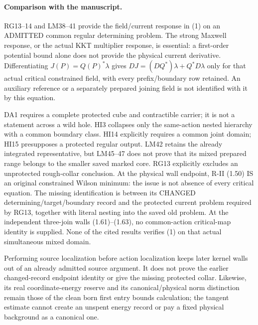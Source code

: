 \documentclass[11pt]{article}
\begin{document}
\paragraph{Comparison with the manuscript.}
RG13--14 and LM38--41 provide the field/current response in (1) on an ADMITTED
common regular determining problem. The strong Maxwell response, or the actual
KKT multiplier response, is essential: a first-order potential bound alone does
not provide the physical current derivative. Differentiating
$J(P)=Q(P)^*\lambda$ gives
$DJ=(DQ^*)\lambda+Q^*D\lambda$ only for that actual critical constrained field,
with every prefix/boundary row retained. An auxiliary reference or a separately
prepared joining field is not identified with it by this equation.

DA1 requires a complete protected cube and contractible carrier; it is not a
statement across a wild hole. HI3 collapses only the same-action nested hierarchy
with a common boundary class. HI14 explicitly requires a common joint domain;
HI15 presupposes a protected regular output. LM42 retains the already integrated
representative, but LM45--47 does not prove that its mixed prepared range belongs
to the smaller saved marked core. RG13 explicitly excludes an unprotected
rough-collar conclusion. At the physical wall endpoint, R-II (1.50) IS an original constrained Wilson
minimum: the issue is not absence of every critical equation. The missing
identification is between its CHANGED determining/target/boundary record and
the protected current problem required by RG13, together with literal nesting
into the saved old problem. At the independent three-join walls (1.61)--(1.63),
no common-action critical-map identity is supplied. None of the cited results
verifies (1) on that actual simultaneous mixed domain.

Performing source localization before action localization keeps later kernel
walls out of an already admitted source argument. It does not prove the earlier
changed-record endpoint identity or give the missing protected collar. Likewise,
its real coordinate-energy reserve and its canonical/physical norm distinction
remain those of the clean born first entry bounds calculation; the tangent estimate cannot create an unspent
energy record or pay a fixed physical background as a canonical one.
\end{document}
